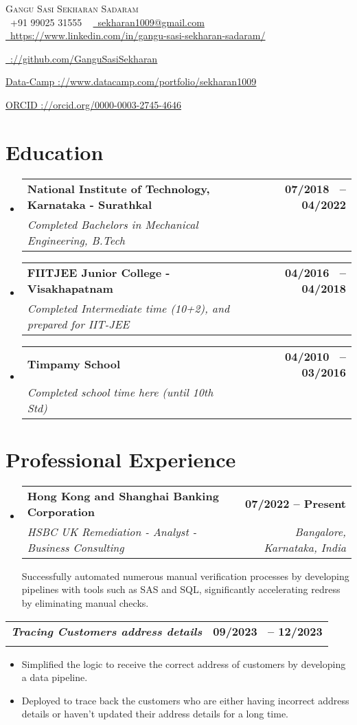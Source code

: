 \documentclass[letterpaper,11pt]{article}
\makeatletter
\newcommand{\resumeSubheading}[4]{
  \vspace{-2pt}\item
    \begin{tabular*}{1.0\textwidth}[t]{l@{\extracolsep{\fill}}r}
      \textbf{#1} & \textbf{\small #2} \\
      \textit{\small#3} & \textit{\small #4} \\
    \end{tabular*}\vspace{-7pt}
}
\newcommand{\resumeSubHeadingListStart}{\begin{itemize}[leftmargin=0.0in, label={}]}
\newcommand{\resumeSubHeadingListEnd}{\end{itemize}}
\def\titlesection{
\begin{center}
    {\Huge \scshape Gangu Sasi Sekharan Sadaram} \\ \vspace{1pt}
    \small 
    \raisebox{-0.1\height}\faPhone\ +91 99025 31555 ~ \href{mailto:\email}{\raisebox{-0.2\height}\faEnvelope\  sekharan1009@gmail.com} 
    \href{\linkedin}{\raisebox{-0.2\height}\faLinkedin\ https://www.linkedin.com/in/gangu-sasi-sekharan-sadaram/} 

    \vspace{1pt}
    \href{\github}{\raisebox{-0.2\height}\faGithub\ \underline{\https://github.com/GanguSasiSekharan}}

    \vspace{1pt}
    \href{\ORCID}{\raisebox{-0.2\height}\faORCID Data-Camp
    \underline{\https://www.datacamp.com/portfolio/sekharan1009}}

    \vspace{1pt}
    \href{\ORCID}{\raisebox{-0.2\height}\faORCID ORCID
    \underline{\https://orcid.org/0000-0003-2745-4646}}
    \vspace{-8pt}
\end{center}
}
\makeatother
\begin{document}
\titlesection
\profileSummary

\vspace{-10pt}
\section{Education}
  \resumeSubHeadingListStart
      \resumeSubheading{National Institute of Technology, Karnataka - Surathkal}
      {07/2018 \ -- 04/2022}
      {Completed Bachelors in Mechanical Engineering, B.Tech}{}
 \vspace{-5pt}

      \resumeSubheading{FIITJEE Junior College - Visakhapatnam}
      {04/2016 \ -- 04/2018}
      {Completed Intermediate time (10+2), and prepared for IIT-JEE}{}
\vspace{-5pt}
      
      \resumeSubheading{Timpamy School}
      {04/2010 \ -- 03/2016}
      {Completed school time here (until 10th Std)}{}
  \resumeSubHeadingListEnd

\newcommand{\renderExp}[1]{
\resumeSubheading
      {\csname #1@Company\endcsname}{\csname #1@Start\endcsname -- \csname #1@End\endcsname}
      {\csname #1@Designation\endcsname}{\csname #1@Location\endcsname}
      \csname #1@Highlights\endcsname
}

\vspace{-10pt}

\section{Professional Experience}
    \resumeSubHeadingListStart
      \resumeSubheading{\textbf{Hong Kong and Shanghai Banking Corporation}}{07/2022 -- Present}
      {HSBC UK Remediation - Analyst - Business Consulting} {Bangalore, Karnataka, India}
      \vspace{1pt}
             
      Successfully automated numerous manual verification processes by developing pipelines with tools such as SAS and SQL, significantly accelerating redress by eliminating manual checks. 
    \resumeSubHeadingListEnd

\vspace{-10pt}
        \resumeSubheading{\textit{Tracing Customers address details}}
        {09/2023 \ -- 12/2023}{}{}
        \vspace{-18pt}
        \begin{itemize}
            \item Simplified the logic to receive the correct address of customers by developing a data pipeline.
            \vspace{-6pt}
            \item Deployed to trace back the customers who are either having incorrect address details or haven't updated their address details for a long time.
        \end{itemize}
        \vspace{-5pt}
        
\end{document}

